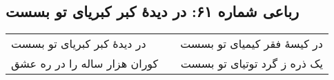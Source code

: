 \begin{center}
\section*{رباعی شماره ۶۱: در دیدهٔ کبر کبریای تو بسست}
\label{sec:sh061}
\begin{longtable}{l p{0.5cm} r}
در دیدهٔ کبر کبریای تو بسست
&&
در کیسهٔ فقر کیمیای تو بسست
\\
کوران هزار ساله را در ره عشق
&&
یک ذره ز گرد توتیای تو بسست
\\
\end{longtable}
\end{center}
